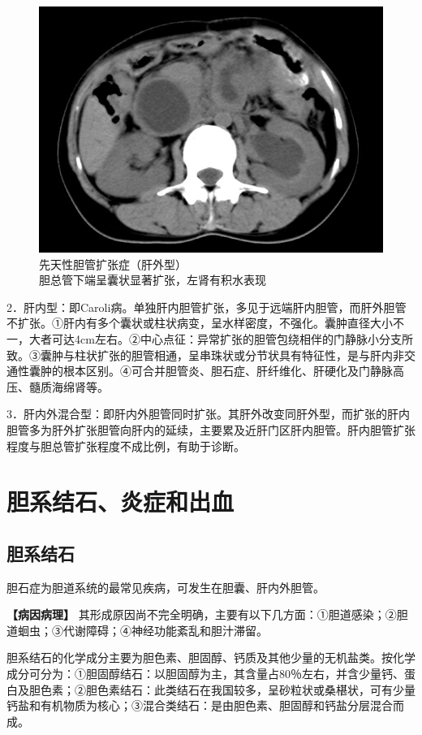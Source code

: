 \begin{figure}[!htbp]
 \centering
 \includegraphics[width=.7\textwidth,height=\textheight,keepaspectratio]{./images/Image00292.jpg}
 \captionsetup{justification=centering}
 \caption{先天性胆管扩张症（肝外型）\\{\small 胆总管下端呈囊状显著扩张，左肾有积水表现}}
 \label{fig12-2}
  \end{figure} 

2．肝内型：即Caroli病。单独肝内胆管扩张，多见于远端肝内胆管，而肝外胆管不扩张。①肝内有多个囊状或柱状病变，呈水样密度，不强化。囊肿直径大小不一，大者可达4cm左右。②中心点征：异常扩张的胆管包绕相伴的门静脉小分支所致。③囊肿与柱状扩张的胆管相通，呈串珠状或分节状具有特征性，是与肝内非交通性囊肿的根本区别。④可合并胆管炎、胆石症、肝纤维化、肝硬化及门静脉高压、髓质海绵肾等。

3．肝内外混合型：即肝内外胆管同时扩张。其肝外改变同肝外型，而扩张的肝内胆管多为肝外扩张胆管向肝内的延续，主要累及近肝门区肝内胆管。肝内胆管扩张程度与胆总管扩张程度不成比例，有助于诊断。

\section{胆系结石、炎症和出血}

\subsection{胆系结石}

胆石症为胆道系统的最常见疾病，可发生在胆囊、肝内外胆管。

\textbf{【病因病理】}
其形成原因尚不完全明确，主要有以下几方面：①胆道感染；②胆道蛔虫；③代谢障碍；④神经功能紊乱和胆汁滞留。

胆系结石的化学成分主要为胆色素、胆固醇、钙质及其他少量的无机盐类。按化学成分可分为：①胆固醇结石：以胆固醇为主，其含量占80％左右，并含少量钙、蛋白及胆色素；②胆色素结石：此类结石在我国较多，呈砂粒状或桑椹状，可有少量钙盐和有机物质为核心；③混合类结石：是由胆色素、胆固醇和钙盐分层混合而成。

